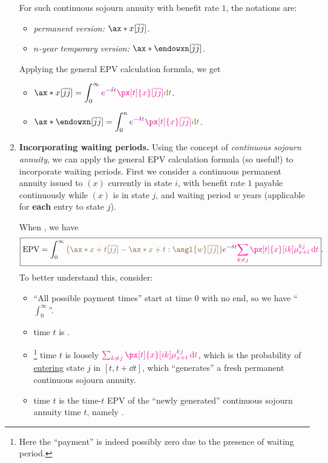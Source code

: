 \begin{enumerate}
For such continuous sojourn annuity with benefit rate \(1\), the notations are:
\begin{itemize}
\item \emph{permanent version:} \(\ax*{x}[\overline{jj}]\).
\item \emph{\(n\)-year temporary version:} \(\ax*{\endowxn}[\overline{jj}]\).
\end{itemize}
Applying the general EPV calculation formula, we get
\begin{itemize}
\item \(\displaystyle \ax*{x}[\overline{jj}]=\int_{0}^{\infty}\vc{e^{-\delta t}}
\mgc{\px[t]{x}[\overline{jj}]}\brc{\dd{t}}\).
\item \(\displaystyle \ax*{\endowxn}[\overline{jj}]=\int_{0}^{n}\vc{e^{-\delta t}}
\mgc{\px[t]{x}[\overline{jj}]}\brc{\dd{t}}\).
\end{itemize}

\item \label{it:wait-cts-ann-inej} \textbf{Incorporating waiting periods.}
Using the concept of \emph{continuous sojourn annuity}, we can apply the
general EPV calculation formula (so useful!) to incorporate waiting periods.
First we consider a continuous permanent annuity issued to \((x)\) currently in
state \(i\), with benefit rate \(1\) payable continuously while \((x)\) is in
state \(j\), and waiting period \(w\) years (applicable for \textbf{each} entry
to state \(j\)).

When , we have
\[
\boxed{\text{EPV}=\int_{0}^{\infty}\brc{\qty(\ax*{x+t}[\overline{jj}]-\ax*{x+t:\angl{w}}[\overline{jj}])}
\vc{e^{-\delta t}}\mgc{\sum_{k\ne j}^{}\px[t]{x}[ik]\mu_{x+t}^{kj}\dd{t}}}.
\]
To better understand this, consider:
\begin{itemize}
\item ``All possible payment times'' start at time \(0\) with no end, so we have ``\(\int_{0}^{\infty}\)''.
\item {}  time \(t\) is .
\item {}\footnote{Here the ``payment'' is
indeed possibly zero due to the presence of waiting period.}  time
\(t\) is loosely \(\mgc{\sum_{k\ne j}^{}\px[t]{x}[ik]\mu_{x+t}^{kj}\dd{t}}\),
which is the probability of \underline{entering} state \(j\) in
\([t,t+\dd{t}]\), which ``generates'' a fresh permanent continuous sojourn
annuity.
\item {}  time \(t\) is the time-\(t\) EPV of the
``newly generated'' continuous sojourn annuity  time \(t\), namely
.


\end{itemize}
\end{enumerate}
